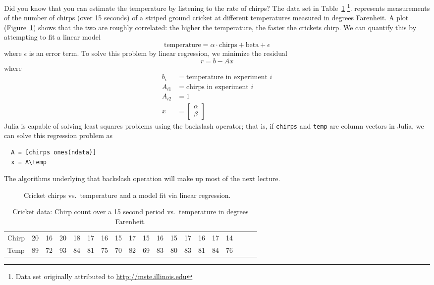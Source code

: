 \documentclass[12pt, leqno]{article}
\begin{document}
Did you know that you can estimate the temperature by listening to the
rate of chirps?  The data set in Table~\ref{table1}%
\footnote{Data set originally attributed to
  \url{http://mste.illinois.edu}}.  represents measurements of the
number of chirps (over 15 seconds) of a striped ground cricket at
different temperatures measured in degrees Farenheit.  A plot
(Figure~\ref{fig2}) shows that the two are roughly correlated: the
higher the temperature, the faster the crickets chirp.  We can
quantify this by attempting to fit a linear model
\[
  \mbox{temperature} = \alpha \cdot \mbox{chirps} + \mbox{beta} + \epsilon
\]
where $\epsilon$ is an error term.  To solve this problem by linear
regression, we minimize the residual
\[
  r = b-Ax
\]
where
\begin{align*}
  b_{i} &= \mbox{temperature in experiment } i \\
  A_{i1} &= \mbox{chirps in experiment } i \\
  A_{i2} &= 1 \\
  x &= \begin{bmatrix} \alpha \\ \beta \end{bmatrix}
\end{align*}
Julia is capable of solving least squares problems using
the backslash operator; that is, if {\tt chirps} and {\tt temp} are
column vectors in Julia, we can solve this regression problem as
\begin{lstlisting}
  A = [chirps ones(ndata)]
  x = A\temp
\end{lstlisting}
The algorithms underlying that backslash operation will make up
most of the next lecture.

\begin{figure}
  \begin{center}
  \end{center}
  \caption{Cricket chirps vs.~temperature and a model fit via
    linear regression.}
  \label{fig2}
\end{figure}

\begin{table}
  \small
  \begin{tabular}{l|cccccccccccccccccc}
    Chirp &
    20& 16& 20& 18& 17& 16& 15& 17& 15& 16& 15& 17& 16& 17& 14 \\
    Temp &
    89& 72& 93& 84& 81& 75& 70& 82& 69& 83& 80& 83& 81& 84& 76
  \end{tabular}
  \caption{Cricket data: Chirp count over a 15 second period vs.~temperature
    in degrees Farenheit.}
  \label{table1}
\end{table}
\end{document}
